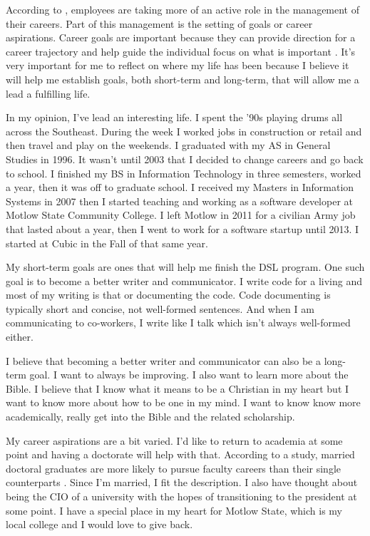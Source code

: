 \documentclass[man]{apa7}
\begin{document}
\setlength{\parindent}{10ex}
According to \textcite{Greco}, employees are taking more of an active role in the management of their careers. Part of this management is the setting of goals or career aspirations. Career goals are important because they can provide direction for a career trajectory and help guide the individual focus on what is important \parencite{Greco}. It's very important for me to reflect on where my life has been because I believe it will help me establish goals, both short-term and long-term, that will allow me a lead a fulfilling life.

\setlength{\parindent}{10ex}
In my opinion, I've lead an interesting life. I spent the '90s playing drums all across the Southeast. During the week I worked jobs in construction or retail and then travel and play on the weekends. I graduated with my AS in General Studies in 1996. It wasn't until 2003 that I decided to change careers and go back to school. I finished my BS in Information Technology in three semesters, worked a year, then it was off to graduate school. I received my Masters in Information Systems in 2007 then I started teaching and working as a software developer at Motlow State Community College. I left Motlow in 2011 for a civilian Army job that lasted about a year, then I went to work for a software startup until 2013. I started at Cubic in the Fall of that same year.

\setlength{\parindent}{10ex}
My short-term goals are ones that will help me finish the DSL program. One such goal is to become a better writer and communicator. I write code for a living and most of my writing is that or documenting the code. Code documenting is typically short and concise, not well-formed sentences. And when I am communicating to co-workers, I write like I talk which isn't always well-formed either. 

\setlength{\parindent}{10ex}
I believe that becoming a better writer and communicator can also be a long-term goal. I want to always be improving. I also want to learn more about the Bible. I believe that I know what it means to be a Christian in my heart but I want to know more about how to be one in my mind. I want to know know more academically, really get into the Bible and the related scholarship.

\setlength{\parindent}{10ex}
My career aspirations are a bit varied. I'd like to return to academia at some point and having a doctorate will help with that. According to a study, married doctoral graduates are more likely to pursue faculty careers than their single counterparts \parencite{Seo}. Since I'm married, I fit the description. I also have thought about being the CIO of a university with the hopes of transitioning to the president at some point. I have a special place in my heart for Motlow State, which is my local college and I would love to give back.
\end{document}

